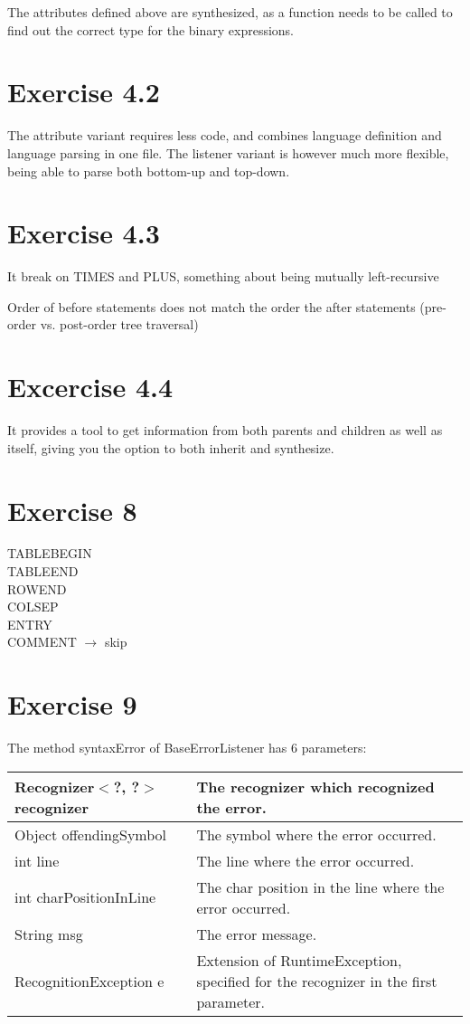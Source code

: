 \documentclass[11pt]{article} %
\begin{document}
The attributes defined above are synthesized, as a function needs to be called to find out the correct type for the binary expressions.


\section*{Exercise 4.2}
The attribute variant requires less code, and combines language definition and language parsing in one file. The listener variant is however much more flexible, being able to parse both bottom-up and top-down.

\section*{Exercise 4.3}
It break on TIMES and PLUS, something about being mutually left-recursive

Order of before statements does not match the order the after statements (pre-order vs. post-order tree traversal)

\section*{Excercise 4.4}
It provides a tool to get information from both parents and children as well as itself, giving you the option to both inherit and synthesize.

\section*{Exercise 8}
TABLEBEGIN \\
TABLEEND \\
ROWEND \\
COLSEP \\
ENTRY \\
COMMENT $\rightarrow$ skip

\section*{Exercise 9}
The method syntaxError of BaseErrorListener has 6 parameters:\\

\begin{tabular}{|l|p{10cm}|}\hline
Recognizer$<$?, ?$>$ recognizer
& The recognizer which recognized the error. \\\hline

Object offendingSymbol
& The symbol where the error occurred. \\\hline

int line
& The line where the error occurred. \\\hline

int charPositionInLine
& The char position in the line where the error occurred. \\\hline

String msg
& The error message. \\\hline

RecognitionException e
& Extension of RuntimeException, specified for the recognizer in the first parameter. \\\hline
\end{tabular} \\
\end{document}
